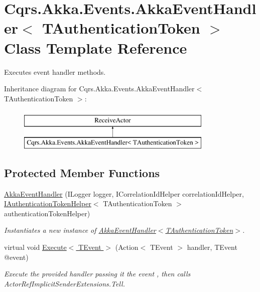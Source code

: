 \hypertarget{classCqrs_1_1Akka_1_1Events_1_1AkkaEventHandler}{}\section{Cqrs.\+Akka.\+Events.\+Akka\+Event\+Handler$<$ T\+Authentication\+Token $>$ Class Template Reference}
\label{classCqrs_1_1Akka_1_1Events_1_1AkkaEventHandler}


Executes event handler methods.  


Inheritance diagram for Cqrs.\+Akka.\+Events.\+Akka\+Event\+Handler$<$ T\+Authentication\+Token $>$\+:\begin{figure}[H]
\begin{center}
\leavevmode
\includegraphics[height=2.000000cm]{classCqrs_1_1Akka_1_1Events_1_1AkkaEventHandler}
\end{center}
\end{figure}
\subsection*{Protected Member Functions}
\begin{DoxyCompactItemize}
\item 
\hyperlink{classCqrs_1_1Akka_1_1Events_1_1AkkaEventHandler_aee50c0ed50e291f311721ca6a103c41f_aee50c0ed50e291f311721ca6a103c41f}{Akka\+Event\+Handler} (I\+Logger logger, I\+Correlation\+Id\+Helper correlation\+Id\+Helper, \hyperlink{interfaceCqrs_1_1Authentication_1_1IAuthenticationTokenHelper}{I\+Authentication\+Token\+Helper}$<$ T\+Authentication\+Token $>$ authentication\+Token\+Helper)
\begin{DoxyCompactList}\small\item\em Instantiates a new instance of \hyperlink{classCqrs_1_1Akka_1_1Events_1_1AkkaEventHandler_aee50c0ed50e291f311721ca6a103c41f_aee50c0ed50e291f311721ca6a103c41f}{Akka\+Event\+Handler$<$\+T\+Authentication\+Token$>$}. \end{DoxyCompactList}\item 
virtual void \hyperlink{classCqrs_1_1Akka_1_1Events_1_1AkkaEventHandler_af277504938e0513e05f3a8784ece2af2_af277504938e0513e05f3a8784ece2af2}{Execute$<$ T\+Event $>$} (Action$<$ T\+Event $>$ handler, T\+Event @event)
\begin{DoxyCompactList}\small\item\em Execute the provided {\itshape handler}  passing it the {\itshape event} , then calls Actor\+Ref\+Implicit\+Sender\+Extensions.\+Tell. \end{DoxyCompactList}\end{DoxyCompactItemize}
